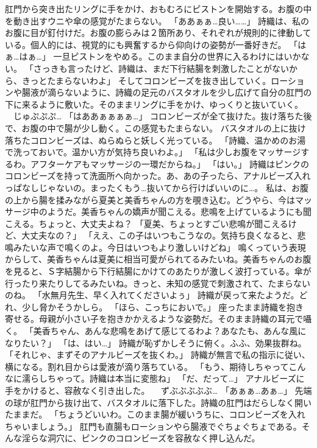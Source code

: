 肛門から突き出たリングに手をかけ、おもむろにピストンを開始する。お腹の中を動き出すウニや傘の感覚がたまらない。
「ああぁぁ…良い……」
詩織は、私のお腹に目が釘付けだ。お腹の膨らみは２箇所あり、それぞれが規則的に律動している。個人的には、視覚的にも興奮するから仰向けの姿勢が一番好きだ。
「はぁ…はぁ…」
一旦ピストンをやめる。このまま自分の世界に入るわけにはいかない。
「さっきも言ったけど、詩織は、まだ下行結腸を刺激したことがないから、きっとたまらないわよ」
そしてコロンビーズを抜き出していく。ローションや腸液が滴らないように、詩織の足元のバスタオルを少し広げて自分の肛門の下に来るように敷いた。そのままリングに手をかけ、ゆっくりと抜いていく。
　じゅぷぷぷ…
「はああぁぁぁぁ…」
コロンビーズが全て抜けた。抜け落ちた後で、お腹の中で腸が少し動く。この感覚もたまらない。
バスタオルの上に抜け落ちたコロンビーズは、ぬらぬらと妖しく光っている。
「詩織、温かめのお湯で洗っておいで。温かい方が気持ち良いわよ。」
「私は少しお腹をマッサージするわ。アフターケアもマッサージの一環だからね。」
「はい。」
詩織はピンクのコロンビーズを持って洗面所へ向かった。あ、あの子ったら、アナルビーズ入れっぱなしじゃないの。まったくもう…抜いてから行けばいいのに…。
私は、お腹の上から腸を揉みながら夏美と美香ちゃんの方を覗き込む。どうやら、今はマッサージ中のようだ。美香ちゃんの嬌声が聞こえる。悲鳴を上げているようにも聞こえる。ちょっと、大丈夫よね？
「夏美、ちょっとすごい悲鳴が聞こえるけど、大丈夫なの？」
「ええ、この子はいつもこうなの。気持ち良くなると、悲鳴みたいな声で鳴くのよ。今日はいつもより激しいけどね」
鳴くっていう表現からして、美香ちゃんは夏美に相当可愛がられてるみたいね。美香ちゃんのお腹を見ると、Ｓ字結腸から下行結腸にかけてのあたりが激しく波打っている。傘が行ったり来たりしてるみたいね。きっと、未知の感覚で刺激されて、たまらないのね。
「水無月先生、早く入れてくださいよぅ」
詩織が戻って来たようだ。どれ、少し脅かそうかしら。
「ほら、こっちにおいで。」
座ったまま詩織を抱き寄せる。母親が小さい子を抱きかかえるような姿勢だ。そのまま詩織の耳元で囁く。
「美香ちゃん、あんな悲鳴をあげて感じてるわよ？あなたも、あんな風になりたい？」
「は、はい…」
詩織が恥ずかしそうに俯く。ふふ、効果抜群ね。
「それじゃ、まずそのアナルビーズを抜くわ。」
詩織が無言で私の指示に従い、横になる。割れ目からは愛液が滴り落ちている。
「もう、期待しちゃってこんなに濡らしちゃって。詩織は本当に変態ね」
「だ、だって…」
アナルビーズに手をかけると、容赦なく引き出した。
　ずぶぶぶぶぶ…
「あぁぁ…あぁ…」
先端の球が肛門から抜け出て、バスタオルに落下した。詩織の肛門はだらしなく開いたままだ。
「ちょうどいいわ。このまま腸が緩いうちに、コロンビーズを入れちゃいましょう。」
肛門も直腸もローションやら腸液でぐちょぐちょである。そんな淫らな洞穴に、ピンクのコロンビーズを容赦なく押し込んだ。
